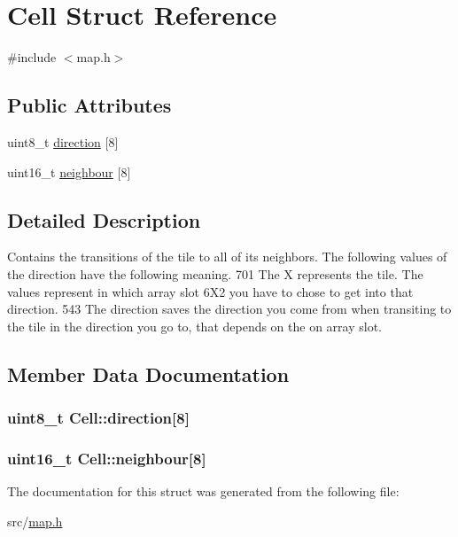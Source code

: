 \hypertarget{struct_cell}{}\section{Cell Struct Reference}
\label{struct_cell}


{\ttfamily \#include $<$map.\+h$>$}

\subsection*{Public Attributes}
\begin{DoxyCompactItemize}
\item 
uint8\+\_\+t \hyperlink{struct_cell_a8740ff58f9f8259d73d481b02fed3e2d}{direction} \mbox{[}8\mbox{]}
\item 
uint16\+\_\+t \hyperlink{struct_cell_aa2d9a76a979ee132fe05781b73057e53}{neighbour} \mbox{[}8\mbox{]}
\end{DoxyCompactItemize}


\subsection{Detailed Description}
Contains the transitions of the tile to all of its neighbors. The following values of the direction have the following meaning. 701 The X represents the tile. The values represent in which array slot 6\+X2 you have to chose to get into that direction. 543 The direction saves the direction you come from when transiting to the tile in the direction you go to, that depends on the on array slot. 

\subsection{Member Data Documentation}
\subsubsection[{\texorpdfstring{direction}{direction}}]{\setlength{\rightskip}{0pt plus 5cm}uint8\+\_\+t Cell\+::direction\mbox{[}8\mbox{]}}\hypertarget{struct_cell_a8740ff58f9f8259d73d481b02fed3e2d}{}\label{struct_cell_a8740ff58f9f8259d73d481b02fed3e2d}
\subsubsection[{\texorpdfstring{neighbour}{neighbour}}]{\setlength{\rightskip}{0pt plus 5cm}uint16\+\_\+t Cell\+::neighbour\mbox{[}8\mbox{]}}\hypertarget{struct_cell_aa2d9a76a979ee132fe05781b73057e53}{}\label{struct_cell_aa2d9a76a979ee132fe05781b73057e53}


The documentation for this struct was generated from the following file\+:\begin{DoxyCompactItemize}
\item 
src/\hyperlink{map_8h}{map.\+h}\end{DoxyCompactItemize}
